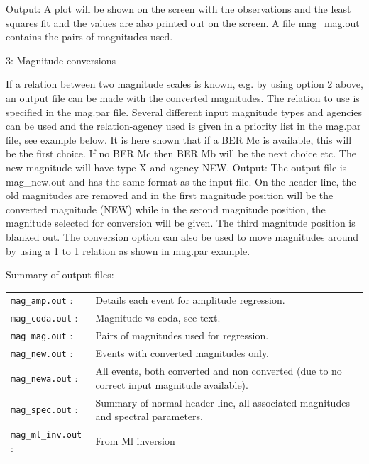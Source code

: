 Output: A plot will be shown on the screen with the observations and the least squares fit and the values are also printed out on the screen. A file mag\_mag.out contains the pairs of magnitudes used. 

3: Magnitude conversions 

If a relation between two magnitude scales is known, e.g. by using option 2 above, an output file can be made with the converted magnitudes. The relation to use is specified in the mag.par file. Several different input magnitude types and agencies can be used and the relation-agency used is given in a priority list in the mag.par file, see example below. It is here shown that if a BER Mc is available, this will be the first choice. If no BER Mc then BER Mb will be the next choice etc. The new magnitude will have type X and agency NEW. Output: The output file is mag\_new.out and has the same format as the input file. On the header line, the old magnitudes are removed and in the first magnitude position will be the converted magnitude (NEW) while in the second magnitude position, the magnitude selected for conversion will be given. The third magnitude position is blanked out. The conversion option can also be used to move magnitudes around by using a 1 to 1 relation as shown in mag.par example. 

Summary of output files: 

\begin{tabular}{lp{10cm}}
\texttt{mag\_amp.out} : & Details each event for amplitude regression. \\
\texttt{mag\_coda.out} : & Magnitude vs coda, see text. \\
\texttt{mag\_mag.out} : & Pairs of magnitudes used for regression. \\
\texttt{mag\_new.out} : & Events with converted magnitudes only. \\
\texttt{mag\_newa.out} : & All events, both converted and non converted (due to no correct input     magnitude available). \\
\texttt{mag\_spec.out} : & Summary of normal header line, all associated magnitudes    and spectral parameters. \\
\texttt{mag\_ml\_inv.out} : & From Ml inversion \\
\end{tabular}

